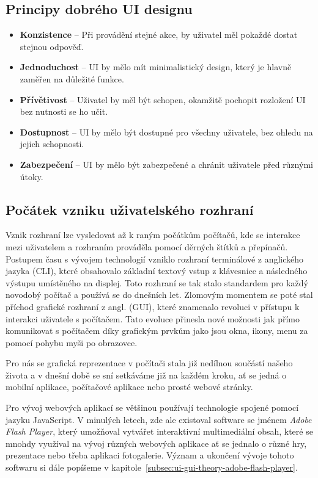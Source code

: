 \subsection*{Principy dobrého UI designu}
\label{subsec:ui-gui-theore-basic-use-case}
\begin{itemize}
    \item \textbf{Konzistence} -- Při provádění stejné akce, by uživatel měl pokaždé dostat stejnou odpověď.
    \item \textbf{Jednoduchost} -- UI by mělo mít minimalistický design, který je hlavně zaměřen na důležité funkce.
    \item \textbf{Přívětivost} -- Uživatel by měl být schopen, okamžitě pochopit rozložení UI bez nutnosti se ho učit.
    \item \textbf{Dostupnost} -- UI by mělo být dostupné pro všechny uživatele, bez ohledu na jejich schopnosti.
    \item \textbf{Zabezpečení} -- UI by mělo být zabezpečené a chránit uživatele před různými útoky.
\end{itemize}

\subsection{Počátek vzniku uživatelského rozhraní}
\label{subsec:ui-gui-theory-beginning}
Vznik rozhraní lze vysledovat až k raným počátkům počítačů, kde se interakce mezi uživatelem a rozhraním prováděla pomocí děrných štítků a přepínačů. Postupem času s vývojem technologií vzniklo rozhraní terminálové z anglického jazyka \textit{} (CLI), které obsahovalo základní textový vstup z klávesnice a následného výstupu umístěného na displej. Toto rozhraní se tak stalo standardem pro každý novodobý počítač a používá se do dnešních let. Zlomovým momentem se poté stal příchod grafické rozhraní z angl. \textit{} (GUI), které znamenalo revoluci v přístupu k interakci uživatele s počítačem. Tato evoluce přinesla nové možnosti jak přímo komunikovat s počítačem díky grafickým prvkům jako jsou okna, ikony, menu za pomocí pohybu myši po obrazovce.

Pro nás se grafická reprezentace v počítači stala již nedílnou součástí našeho života a v dnešní době se sní setkáváme již na každém kroku, ať se jedná o mobilní aplikace, počítačové aplikace nebo prosté webové stránky.

Pro vývoj webových aplikací se většinou používají technologie spojené pomocí jazyku JavaScript. V minulých letech, zde ale existoval software se jménem \textit{Adobe Flash Player}, který umožňoval vytvářet interaktivní multimediální obsah, které se mnohdy využíval na vývoj různých webových aplikace ať se jednalo o různé hry, prezentace nebo třeba aplikaci fotogalerie. Význam a ukončení vývoje tohoto softwaru si dále popíšeme v kapitole~\ref{subsec:ui-gui-theory-adobe-flash-player}.

